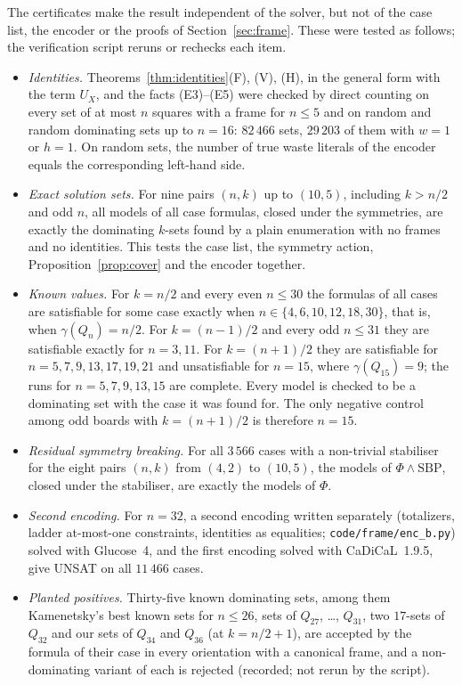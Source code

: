 \documentclass[11pt]{article}
\theoremstyle{definition}
\theoremstyle{remark}
\begin{document}
The certificates make the result independent of the solver, but not of the case list, the encoder or the
proofs of Section~\ref{sec:frame}. These were tested as follows; the verification script reruns or
rechecks each item.
\begin{itemize}
\item \emph{Identities.} Theorems~\ref{thm:identities}(F), (V), (H), in the general form with the term
$U_X$, and the facts (E3)--(E5) were checked by direct counting on every set of at most $n$ squares
with a frame for $n\le5$ and on random and random dominating sets up to $n=16$: $82\,466$ sets, $29\,203$ of
them with $w=1$ or $h=1$. On random sets, the number of true waste literals of the encoder equals the
corresponding left-hand side.
\item \emph{Exact solution sets.} For nine pairs $(n,k)$ up to $(10,5)$, including $k>n/2$ and odd $n$, all
models of all case formulas, closed under the symmetries, are exactly the dominating $k$-sets found by a
plain enumeration with no frames and no identities. This tests the case list, the symmetry action,
Proposition~\ref{prop:cover} and the encoder together.
\item \emph{Known values.} For $k=n/2$ and every even $n\le30$ the formulas of all cases are
satisfiable for some case exactly when $n\in\{4,6,10,12,18,30\}$, that is, when $\gamma(Q_n)=n/2$. For
$k=(n-1)/2$ and every odd $n\le31$ they are satisfiable exactly for $n=3,11$. For $k=(n+1)/2$ they are
satisfiable for $n=5,7,9,13,17,19,21$ and unsatisfiable for $n=15$, where $\gamma(Q_{15})=9$; the runs for
$n=5,7,9,13,15$ are complete. Every model is checked to be a dominating set with the case it was found
for. The only negative control among odd boards with $k=(n+1)/2$ is therefore $n=15$.
\item \emph{Residual symmetry breaking.} For all $3\,566$ cases with a non-trivial stabiliser for the
eight pairs $(n,k)$ from $(4,2)$ to $(10,5)$, the models of $\Phi\wedge\mathrm{SBP}$, closed under the
stabiliser, are exactly the models of $\Phi$.
\item \emph{Second encoding.} For $n=32$, a second encoding written separately (totalizers, ladder
at-most-one constraints, identities as equalities; \texttt{code/frame/enc\_b.py}) solved with Glucose~4,
and the first encoding solved with CaDiCaL~1.9.5, give UNSAT on all $11\,466$ cases.
\item \emph{Planted positives.} Thirty-five known dominating sets, among them Kamenetsky's best known sets
for $n\le26$, sets of $Q_{27}$, \dots, $Q_{31}$, two $17$-sets of $Q_{32}$ and our sets of $Q_{34}$ and
$Q_{36}$ (at $k=n/2+1$), are accepted by the formula of their case in every orientation with a canonical frame, and a
non-dominating variant of each is rejected (recorded; not rerun by the script).
\end{itemize}
\end{document}
